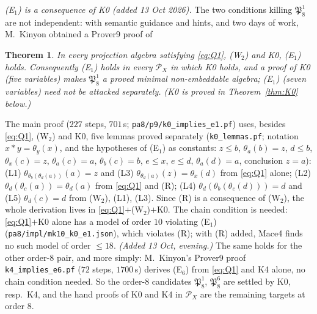 \documentclass[11pt]{amsart}
\newtheorem{theorem}{Theorem}[section]
\theoremstyle{definition}
\renewcommand{\P}{\mathcal{P}}
\begin{document}
\emph{(E$_1$) is a consequence of K0 (added 13 Oct 2026).} The two conditions killing $\mathfrak P_8^1$ are not independent: with semantic guidance and hints, and two days of work, M.~Kinyon obtained a Prover9 proof of

\begin{theorem}\label{thm:K0E1}
In every projection algebra satisfying \eqref{eq:Q1}, \textup{(W$_2$)} and \textup{K0}, \textup{(E$_1$)} holds. Consequently \textup{(E$_1$)} holds in every $\P_X$ in which \textup{K0} holds, and a proof of \textup{K0} (five variables) makes $\mathfrak P_8^1$ a proved minimal non-embeddable algebra; \textup{(E$_1$)} (seven variables) need not be attacked separately. \textup{(K0 is proved in Theorem~\ref{thm:K0} below.)}
\end{theorem}

The main proof ($227$ steps, $701$\,s; \texttt{pa8/p9/k0\_implies\_e1.pf}) uses, besides \eqref{eq:Q1}, (W$_2$) and K0, five lemmas proved separately (\texttt{k0\_lemmas.pf}; notation $x*y=\theta_y(x)$, and the hypotheses of (E$_1$) as constants: $z\le b$, $\theta_a(b)=z$, $d\le b$, $\theta_x(c)=z$, $\theta_a(c)=a$, $\theta_b(c)=b$, $e\le x$, $e\le d$, $\theta_a(d)=a$, conclusion $z=a$): (L1) $\theta_{\theta_b(\theta_d(a))}(a)=z$ and (L3) $\theta_{\theta_d(a)}(z)=\theta_x(d)$ from \eqref{eq:Q1} alone; (L2) $\theta_d(\theta_c(a))=\theta_d(a)$ from \eqref{eq:Q1} and (R); (L4) $\theta_d(\theta_b(\theta_c(d)))=d$ and (L5) $\theta_d(c)=d$ from (W$_2$), (L1), (L3). Since (R) is a consequence of (W$_2$), the whole derivation lives in \eqref{eq:Q1}$+$(W$_2$)$+$K0. The chain condition is needed: \eqref{eq:Q1}$+$K0 alone has a model of order $10$ violating (E$_1$) (\texttt{pa8/impl/mk10\_k0\_e1.json}), which violates (R); with (R) added, Mace4 finds no such model of order $\le18$. \emph{(Added 13 Oct, evening.)} The same holds for the other order-$8$ pair, and more simply: M.~Kinyon's Prover9 proof \texttt{k4\_implies\_e6.pf} ($72$ steps, $1700$\,s) derives (E$_6$) from \eqref{eq:Q1} and K4 alone, no chain condition needed. So the order-$8$ candidates $\mathfrak P_8^1$, $\mathfrak P_8^6$ are settled by K0, resp.\ K4, and the hand proofs of K0 and K4 in $\P_X$ are the remaining targets at order $8$.
\end{document}
